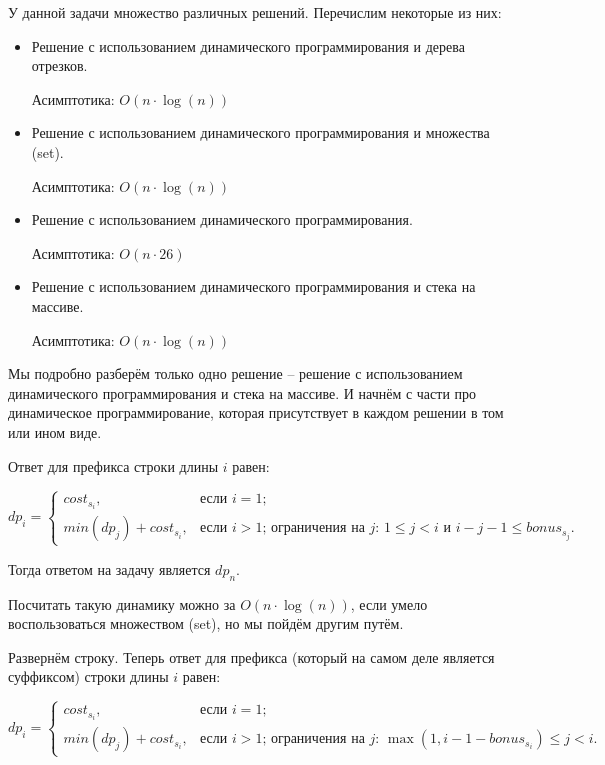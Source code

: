 \solutionSection

У данной задачи множество различных решений. Перечислим некоторые из них:

\begin{itemize}
\item Решение с использованием динамического программирования и дерева отрезков.

Асимптотика: $O(n \cdot \log(n))$
\item Решение с использованием динамического программирования и множества (set).

Асимптотика: $O(n \cdot \log(n))$
\item Решение с использованием динамического программирования.

Асимптотика: $O(n \cdot 26)$
\item Решение с использованием динамического программирования и стека на массиве.

Асимптотика: $O(n \cdot \log(n))$
\end{itemize}

Мы подробно разберём только одно решение -- решение с использованием динамического программирования и стека на массиве. И начнём с части про динамическое программирование, которая присутствует в каждом решении в том или ином виде.

Ответ для префикса строки длины $i$ равен:

\begin{center}

$dp_i = 
\begin{cases}
cost_{s_i},&\text{если $i = 1$;}\\
min(dp_j) + cost_{s_i},&\text{если $i > 1$; ограничения на $j$: $1 \le j < i$ и $i - j - 1 \le bonus_{s_j}$.}
\end{cases}
$

\end{center}

Тогда ответом на задачу является $dp_n$.

Посчитать такую динамику можно за $O(n \cdot \log(n))$, если умело воспользоваться множеством (set), но мы пойдём другим путём.

Развернём строку. Теперь ответ для префикса (который на самом деле является суффиксом) строки длины $i$ равен:

\begin{center}

$dp_i = 
\begin{cases}
cost_{s_i},&\text{если $i = 1$;}\\
min(dp_j) + cost_{s_i},&\text{если $i > 1$; ограничения на $j$: $\max(1, i - 1 - bonus_{s_i}) \le j < i$.}
\end{cases}
$
\end{center}

